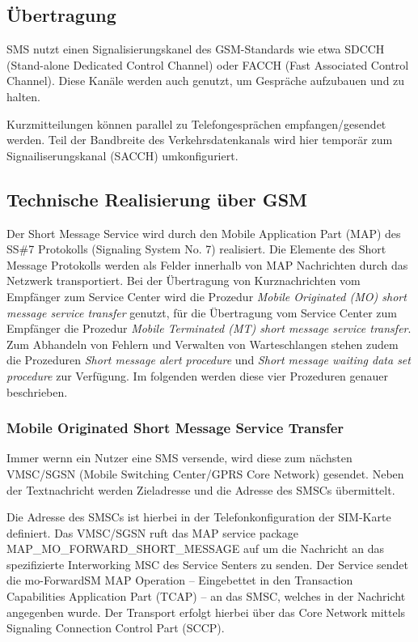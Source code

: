 \documentclass[german,12pt,a4paper]{article}
\begin{document}
\subsection{Übertragung}
SMS nutzt einen Signalisierungskanel des GSM-Standards wie etwa SDCCH (Stand-alone Dedicated Control Channel) 
oder FACCH (Fast Associated Control Channel). Diese Kanäle werden auch genutzt, um Gespräche aufzubauen und zu 
halten.

Kurzmitteilungen können parallel zu Telefongesprächen empfangen/gesendet werden. Teil der Bandbreite des 
Verkehrsdatenkanals wird hier temporär zum Signailiserungskanal (SACCH) umkonfiguriert.


\subsection{Technische Realisierung über GSM}
Der Short Message Service wird durch den Mobile Application Part (MAP) des SS\#7 Protokolls (Signaling 
System No. 7) realisiert. Die Elemente des Short Message Protokolls werden als Felder innerhalb von MAP
Nachrichten durch das Netzwerk transportiert. Bei der Übertragung von Kurznachrichten vom Empfänger zum
Service Center wird die Prozedur \textit{Mobile Originated (MO) short message service transfer} genutzt,
für die Übertragung vom Service Center zum Empfänger die Prozedur \textit{Mobile Terminated (MT) short
message service transfer}. Zum Abhandeln von Fehlern und Verwalten von Warteschlangen stehen zudem die 
Prozeduren \textit{Short message alert procedure} und \textit{Short message waiting data set procedure} 
zur Verfügung.
Im folgenden werden diese vier Prozeduren genauer beschrieben.


\subsubsection{Mobile Originated Short Message Service Transfer}
Immer wernn ein Nutzer eine SMS versende, wird diese zum nächsten VMSC/SGSN (Mobile Switching 
Center/GPRS Core Network) gesendet. Neben der Textnachricht werden Zieladresse und die Adresse des 
SMSCs übermittelt. 

Die Adresse des SMSCs ist hierbei in der Telefonkonfiguration der SIM-Karte definiert. Das VMSC/SGSN 
ruft das MAP service package MAP\_MO\_FORWARD\_SHORT\_MESSAGE auf um die Nachricht an das spezifizierte 
Interworking MSC des Service Senters zu senden. Der Service sendet die mo-ForwardSM MAP Operation --
Eingebettet in den Transaction Capabilities Application Part (TCAP) -- an das SMSC, welches in der 
Nachricht angegenben wurde. Der Transport erfolgt hierbei über das Core Network mittels Signaling 
Connection Control Part (SCCP).
\end{document}

